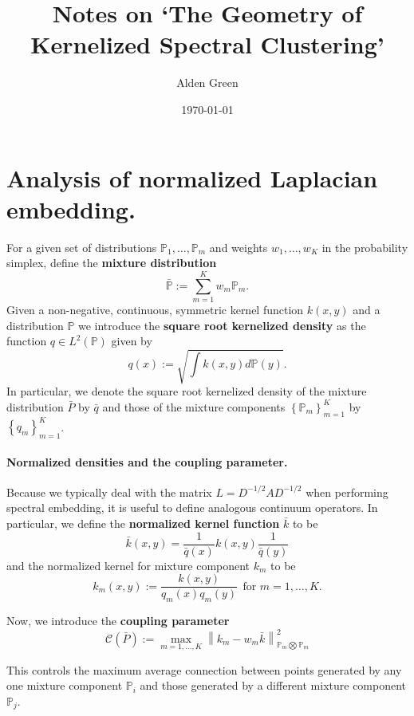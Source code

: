\documentclass{article}
\newcommand{\norm}[1]{\left\lVert#1\right\rVert}
\newcommand{\set}[1]{\left\{#1\right\}}
\newcommand{\PP}{\mathbb{P}}
\theoremstyle{alden}
\theoremstyle{aldenthm}
\theoremstyle{remark}
\begin{document}
	
\title{Notes on `The Geometry of Kernelized Spectral Clustering'}
\author{Alden Green}
\date{\today}
\maketitle

\section{Analysis of normalized Laplacian embedding.}

For a given set of distributions $\mathbb{P}_1, \ldots, \mathbb{P}_m$ and weights $w_1, \ldots, w_K$ in the probability simplex, define the \textbf{mixture distribution}
\begin{equation*}
\bar{\mathbb{P}} := \sum_{m = 1}^{K} w_m \mathbb{P}_m.
\end{equation*}
Given a non-negative, continuous, symmetric kernel function $k(x,y)$ and a distribution $\mathbb{P}$ we introduce the \textbf{square root kernelized density} as the function $q \in L^2(\mathbb{P})$ given by
\begin{equation*}
q(x) := \sqrt{\int k(x,y) d\mathbb{P}(y)}.
\end{equation*}
In particular, we denote the square root kernelized density of the mixture distribution $\bar{P}$ by $\bar{q}$ and those of the mixture components $\set{\PP_m}_{m=1}^{K}$ by $\set{q_m}_{m = 1}^{K}$. 

\paragraph{Normalized densities and the coupling parameter.}

Because we typically deal with the matrix $L = D^{-1/2}AD^{-1/2}$ when performing spectral embedding, it is useful to define analogous continuum operators. In particular, we define the \textbf{normalized kernel function} $\bar{k}$ to be
\begin{equation*}
\bar{k}(x,y) = \frac{1}{\bar{q}(x)} k(x,y) \frac{1}{\bar{q}(y)}
\end{equation*}
and the normalized kernel for mixture component $k_m$ to be
\begin{equation*}
k_m(x,y) := \frac{k(x,y)}{q_m(x) q_m(y)} ~~ \text{for $m = 1,\ldots,K$.}
\end{equation*}

Now, we introduce the \textbf{coupling parameter}
\begin{equation*}
\mathcal{C}(\bar{P}) := \max_{m = 1,\ldots,K} \norm{k_m - w_m \bar{k}}_{\PP_m \bigotimes \PP_m}^2
\end{equation*}

This controls the maximum average connection between points generated by any one mixture component $\PP_i$ and those generated by a different mixture component $\PP_{j}$. 
\end{document}
